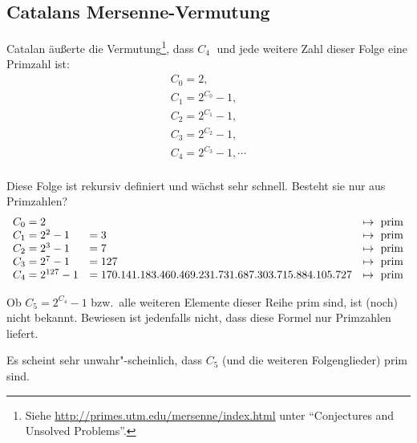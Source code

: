 \begin{refsegment}
\subsection[Catalans Mersenne-Vermutung]{Catalans Mersenne-Vermutung\footnotemark}
\nopagebreak
Catalan
äußerte die Vermutung\footnote{%
Siehe \url{http://primes.utm.edu/mersenne/index.html}
           unter "`Conjectures and Unsolved Problems"'.
         }, dass $ C_4 \;$ und jede weitere Zahl dieser Folge eine Primzahl ist:
$$
\begin{array}{l}
C_0 = 2, \\
C_1 = 2^{C_0} - 1,  \\
C_2 = 2^{C_1} - 1,  \\
C_3 = 2^{C_2} - 1, \\
C_4 = 2^{C_3} - 1, \cdots \\
\end{array}
$$

 Diese Folge ist rekursiv definiert und wächst sehr schnell.
Besteht sie nur aus Primzahlen?
$$
\begin{array}{lll}
C_0 = 2 & & \mapsto {\rm ~prim}\\
C_1 = 2^2 - 1 &    = 3 & \mapsto {\rm ~prim}\\
C_2 = 2^3 - 1 &    = 7 & \mapsto {\rm ~prim} \\
C_3 = 2^7 - 1 &    = 127& \mapsto {\rm ~prim} \\
C_4 = 2^{127} - 1 &      = 170. 141. 183. 460. 469. 231. 731. 687. 303. 715. 884. 105. 727 & \mapsto {\rm ~prim} \\
\end{array}
$$

 Ob $C_5 = 2^{C_4} - 1$ bzw.\ alle weiteren Elemente dieser Reihe prim sind,
ist (noch) nicht bekannt. Bewiesen ist jedenfalls nicht, dass diese Formel nur
Primzahlen liefert.

 Es scheint sehr unwahr"-scheinlich, dass $C_5$ (und die weiteren Folgenglieder) prim sind.


\end{refsegment}

